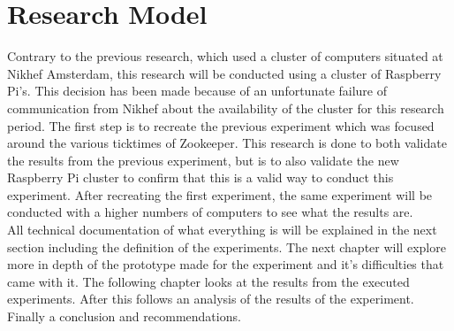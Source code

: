 \section{Research Model}
Contrary to the previous research, which used a cluster of computers situated at Nikhef Amsterdam, this research will be conducted using a cluster of Raspberry Pi's. This decision has been made because of an unfortunate failure of communication from Nikhef about the availability of the cluster for this research period. The first step is to recreate the previous experiment which was focused around the various ticktimes of Zookeeper. This research is done to both validate the results from the previous experiment, but is to also validate the new Raspberry Pi cluster to confirm that this is a valid way to conduct this experiment. After recreating the first experiment, the same experiment will be conducted with a higher numbers of computers to see what the results are. \\
All technical documentation of what everything is will be explained in the next section including the definition of the experiments.
The next chapter will explore more in depth of the prototype made for the experiment and it's difficulties that came with it. The following chapter looks at the results from the  executed experiments. After this follows an analysis of the results of the experiment. Finally a conclusion and recommendations.